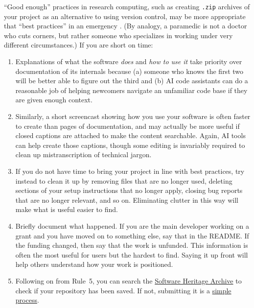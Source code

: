 \documentclass[10pt,letterpaper]{article}
\begin{document}
``Good enough'' practices in research computing,
such as creating \texttt{.zip} archives of your project as an alternative to using version control,
may be more appropriate that ``best practices'' in an emergency \cite{Wilson2017}.
(By analogy,
a paramedic is not a doctor who cuts corners,
but rather someone who specializes in working under very different circumstances.)
If you are short on time:

\begin{enumerate}

\item
  Explanations of what the software \emph{does} and \emph{how to use it}
  take priority over documentation of its internals
  because (a) someone who knows the first two will be better able to figure out the third
  and (b) AI code assistants can do a reasonable job of helping newcomers navigate an unfamiliar code base
  if they are given enough context.

\item
  Similarly,
  a short screencast showing how you use your software
  is often faster to create than pages of documentation,
  and may actually be more useful if closed captions are attached
  to make the content searchable.
  Again,
  AI tools can help create those captions,
  though some editing is invariably required to clean up mistranscription of technical jargon.

\item
  If you do not have time to bring your project in line with best practices,
  try instead to clean it up by removing files that are no longer used,
  deleting sections of your setup instructions that no longer apply,
  closing bug reports that are no longer relevant,
  and so on.
  Eliminating clutter in this way will make what is useful easier to find.

\item
  Briefly document what happened.
  If you are the main developer working on a grant and you have moved on to something else,
  say that in the README.
  If the funding changed, then say that the work is unfunded.
  This information is often the most useful for users but the hardest to find.
  Saying it up front will help others understand how your work is positioned.

\item
  Following on from Rule~5,
  you can search the \href{https://archive.softwareheritage.org/browse/search/}{Software Heritage Archive}
  to check if your repository has been saved.
  If not,
  submitting it is a \href{https://archive.softwareheritage.org/save/}{simple process}.

\end{enumerate}
\end{document}
